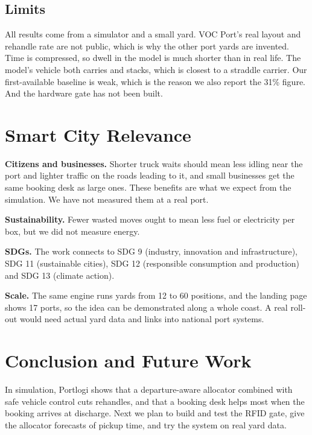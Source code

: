 \documentclass[conference]{IEEEtran}
\begin{document}
\subsection{Limits}
All results come from a simulator and a small yard. VOC Port's real layout and rehandle rate are not public, which is why the other port yards are invented. Time is compressed, so dwell in the model is much shorter than in real life. The model's vehicle both carries and stacks, which is closest to a straddle carrier. Our first-available baseline is weak, which is the reason we also report the 31\% figure. And the hardware gate has not been built.

\section{Smart City Relevance}
\textbf{Citizens and businesses.} Shorter truck waits should mean less idling near the port and lighter traffic on the roads leading to it, and small businesses get the same booking desk as large ones. These benefits are what we expect from the simulation. We have not measured them at a real port.

\textbf{Sustainability.} Fewer wasted moves ought to mean less fuel or electricity per box, but we did not measure energy.

\textbf{SDGs.} The work connects to SDG 9 (industry, innovation and infrastructure), SDG 11 (sustainable cities), SDG 12 (responsible consumption and production) and SDG 13 (climate action).

\textbf{Scale.} The same engine runs yards from 12 to 60 positions, and the landing page shows 17 ports, so the idea can be demonstrated along a whole coast. A real roll-out would need actual yard data and links into national port systems.

\section{Conclusion and Future Work}
In simulation, Portlogi shows that a departure-aware allocator combined with safe vehicle control cuts rehandles, and that a booking desk helps most when the booking arrives at discharge. Next we plan to build and test the RFID gate, give the allocator forecasts of pickup time, and try the system on real yard data.
\end{document}

